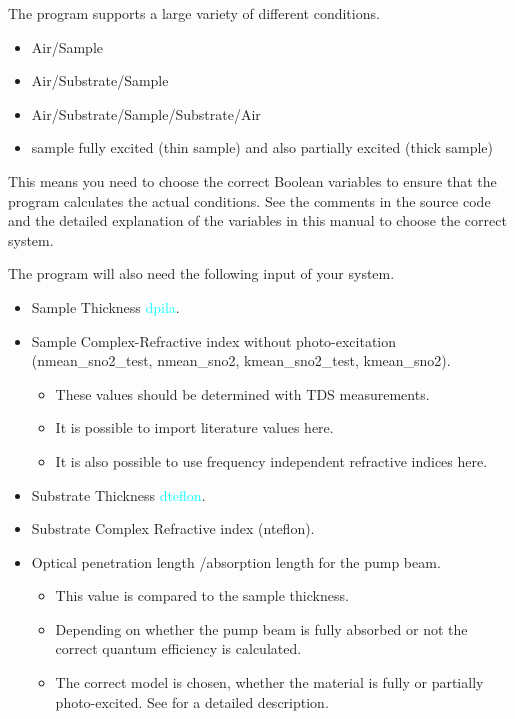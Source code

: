 \documentclass[12pt]{article}
\begin{document}
The program supports a large variety of different conditions. 
\begin{itemize}
	\item Air/Sample 
	\item Air/Substrate/Sample
	\item Air/Substrate/Sample/Substrate/Air
	\item sample fully excited (thin sample) and also partially excited (thick sample) 
\end{itemize}
This means you need to choose the correct Boolean variables to ensure that the program calculates the actual conditions. See the comments in the source code and the detailed explanation of the variables in this manual to choose the correct system. 

The program will also need the following input of your system. 
\begin{itemize}
	\item Sample Thickness \textcolor{cyan}{dpila}.
	\item Sample Complex-Refractive index without photo-excitation (nmean\_sno2\_test, nmean\_sno2, kmean\_sno2\_test, kmean\_sno2).
	\begin{itemize}
		\item These values should be determined with TDS measurements.
		\item It is possible to import literature values here.
		\item It is also possible to use frequency independent refractive indices here.
	\end{itemize}
	\item Substrate Thickness \textcolor{cyan}{dteflon}.
	\item Substrate Complex Refractive index (nteflon).
	\item Optical penetration length /absorption length for the pump beam.
	\begin{itemize}
		\item This value is compared to the sample thickness.
		\item Depending on whether the pump beam is fully absorbed or not the correct quantum efficiency is calculated.
		\item The correct model is chosen, whether the material is fully or partially photo-excited. See \cite{thinfilm} for a detailed description.
	\end{itemize}
\end{itemize}
\end{document}
